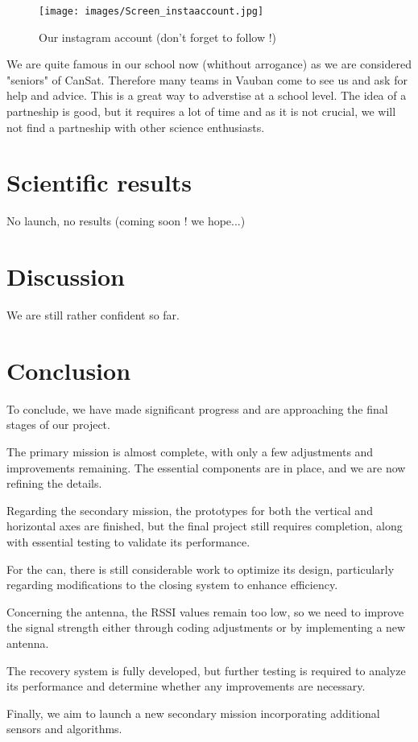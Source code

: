 \documentclass[]{article}
\begin{document}
\begin{figure}[h] 
    \centering
    \texttt{[image: images/Screen\_instaaccount.jpg]} 
    \caption{Our instagram account (don't forget to follow !)}
\end{figure}

We are quite famous in our school now (whithout arrogance) as we are considered "seniors" of CanSat. 
Therefore many teams in Vauban come to see us and ask for help and advice. This is a great way to
adverstise at a school level. The idea of a partneship is good, but it requires a lot of time and as
it is not crucial, we will not find a partneship with other science enthusiasts. 




\section{Scientific results}

No launch, no results (coming soon ! we hope...)



\section{Discussion}

We are still rather confident so far.


\section{Conclusion}

To conclude, we have made significant progress and are approaching the final stages of our project.

The primary mission is almost complete, with only a few adjustments and improvements remaining. The essential components are in place, and we are now refining the details.

Regarding the secondary mission, the prototypes for both the vertical and horizontal axes are finished, but the final project still requires completion, along with essential testing to validate its performance.

For the can, there is still considerable work to optimize its design, particularly regarding modifications to the closing system to enhance efficiency.

Concerning the antenna, the RSSI values remain too low, so we need to improve the signal strength either through coding adjustments or by implementing a new antenna.

The recovery system is fully developed, but further testing is required to analyze its performance and determine whether any improvements are necessary.

Finally, we aim to launch a new secondary mission incorporating additional sensors and algorithms.
\end{document}
